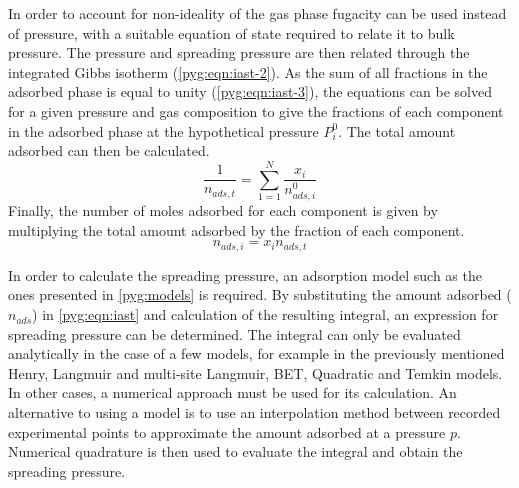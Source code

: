 In order to account for non-ideality of the gas phase
fugacity can be used instead of pressure,
with a suitable equation of state required to relate it to bulk pressure.
The pressure and spreading pressure are then related through
the integrated Gibbs isotherm (\autoref{pyg:eqn:iast-2}). As the sum of all
fractions in the adsorbed phase is equal to unity (\autoref{pyg:eqn:iast-3}),
the equations can be solved for a given pressure and gas composition to give
the fractions of each component in the adsorbed phase at the hypothetical
pressure \(P_{i}^{0}\). The total amount adsorbed can then be calculated.
%
\begin{equation}
	\frac{1}{n_{ads,t}} = \sum_{1=1}^{N} \frac{x_i}{n_{ads,i}^0}
\end{equation}
%
Finally, the number of moles adsorbed for each component is given
by multiplying the total amount adsorbed by the fraction of each
component.
%
\begin{equation}
	n_{ads, i} = x_i n_{ads,t}
\end{equation}

In order to calculate the spreading pressure, an adsorption model
such as the ones presented in \autoref{pyg:models} is required.
By substituting the amount adsorbed (\(n_{ads}\)) in \autoref{pyg:eqn:iast}
and calculation of the resulting integral, an expression for
spreading pressure can be determined. The integral can only be
evaluated analytically in the case of a few models, for example in
the previously mentioned Henry, Langmuir and multi-site Langmuir,
BET, Quadratic and Temkin models. In other cases, a numerical approach
must be used for its calculation. An alternative to using a
model is to use an interpolation method between recorded experimental
points to approximate the amount adsorbed at a pressure \(p\). Numerical
quadrature is then used to evaluate the integral and obtain the
spreading pressure.